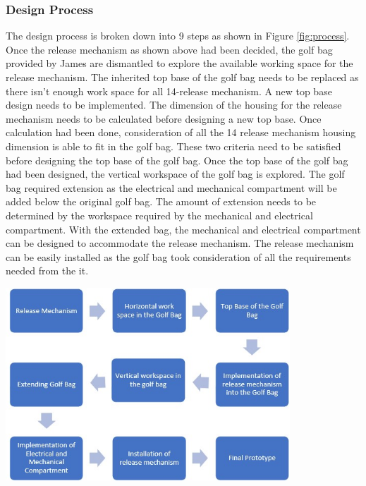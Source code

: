 \documentclass[11pt,landscape]{article}
\newenvironment{Figure}
  {\par\medskip\noindent\minipage{\linewidth}}
  {\endminipage\par\medskip}
\begin{document}
\begin{multicols}{3}
    \subsubsection{Design Process}
    The design process is broken down into 9 steps as shown in Figure \ref{fig:process}.
Once the release mechanism as shown above had been decided, the golf bag provided by James are dismantled to explore the available working space for the release mechanism. The inherited top base of the golf bag needs to be replaced as there isn’t enough work space for all 14-release mechanism. A new top base design needs to be implemented. The dimension of the housing for the release mechanism needs to be calculated before designing a new top base. Once calculation had been done, consideration of all the 14 release mechanism housing dimension is able to fit in the golf bag. These two criteria need to be satisfied before designing the top base of the golf bag. Once the top base of the golf bag had been designed, the vertical workspace of the golf bag is explored. The golf bag required extension as the electrical and mechanical compartment will be added below the original golf bag. The amount of extension needs to be determined by the workspace required by the mechanical and electrical compartment. With the extended bag, the mechanical and electrical compartment can be designed to accommodate the release mechanism. The release mechanism can be easily installed as the golf bag took consideration of all the requirements needed from the it. 
    \begin{Figure}
        \begin{center}
            \includegraphics[width=0.8\textwidth]{Figure40.jpg}
            \label{fig:process}
        \end{center}
    \end{Figure}


\end{multicols}
\end{document}
